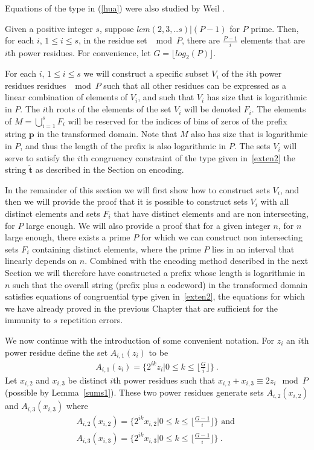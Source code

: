 Equations of the type in (\ref{hua}) were also studied by Weil
\cite{weil:49}.

Given a positive integer $s$, suppose $lcm(2,3,..s) | (P-1)$ for
$P$ prime. Then, for each $i$, $1 \leq i \leq s$, in the residue
set $\mod P$, there are $\frac{P-1}{i}$ elements that are $i$th
power residues. For convenience, let $G = \lfloor log_2(P)
\rfloor$.

For each $i$, $1 \leq i \leq s$ we will construct a specific
subset $V_i$ of the $i$th power residues residues $\mod P$ such
that all other residues can be expressed as a linear combination
of elements of $V_i$, and such that $V_i$ has size that is
logarithmic in $P$. The $i$th roots of the elements of the set
$V_i$ will be denoted $F_i$. The elements of $M =\bigcup_{i=1}^s
F_i$ will be reserved for the indices of bins of zeros of the
prefix string $\mathbf{p}$ in the transformed domain. Note that
$M$ also has size that is logarithmic in $P$, and thus the length
of the prefix is also logarithmic in $P$. The sets $V_i$ will
serve to satisfy the $i$th congruency constraint of the type given
in~\eqref{exten2} the string $\mathbf{\tilde{t}}$ as described in
the Section on encoding.

In the remainder of this section we will first show how to
construct sets $V_i$, and then we will provide the proof that it
is possible to construct sets $V_i$ with all distinct elements and
sets $F_i$ that have distinct elements and are non intersecting,
for $P$ large enough. We will also provide a proof that for a
given integer $n$, for $n$ large enough, there exists a prime $P$
for which we can construct non intersecting sets $F_i$ containing
distinct elements, where the prime $P$ lies in an interval that
linearly depends on $n$. Combined with the encoding method
described in the next Section we will therefore have constructed a
prefix whose length is logarithmic in $n$ such that the overall
string (prefix plus a codeword) in the transformed domain
satisfies equations of congruential type given in~\eqref{exten2},
the equations for which we have already proved in the previous
Chapter that are sufficient for the immunity to $s$ repetition
errors.



We now continue with the introduction of some convenient notation.
For $z_i$ an $i$th power residue define the set $A_{i,1}(z_i)$ to
be
\begin{eqnarray}\label{azi1}A_{i,1}(z_i)=\{2^{ik}z_i | 0 \leq k \leq
\lfloor\frac{G}{i} \rfloor \}~.\end{eqnarray}
Let $x_{i,2}$ and
$x_{i,3}$ be distinct $i$th power residues such that
$x_{i,2}+x_{i,3} \equiv 2z_i \mod P$ (possible by
Lemma~\ref{sums1}). These two power residues generate sets
$A_{i,2}(x_{i,2})$ and  $A_{i,3}(x_{i,3})$ where
\begin{eqnarray}\label{azi2} A_{i,2}(x_{i,2}) =\{ 2^{ik}x_{i,2}| 0 \leq k \leq \lfloor
\frac{G-1}{i} \rfloor \} \text{ and }\\
\label{azi3}A_{i,3}(x_{i,3}) =\{ 2^{ik}x_{i,3}| 0 \leq k \leq
\lfloor \frac{G-1}{i} \rfloor \}~.\end{eqnarray}

